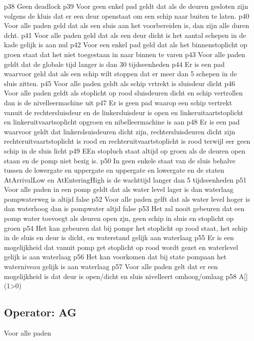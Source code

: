 p38 Geen deadlock
p39 Voor geen enkel pad geldt dat als  de deuren gesloten zijn volgens de kluis dat er een deur openstaat om een schip naar buiten te laten.
p40 Voor alle paden geld dat als een sluis aan het voorbereiden is, dan zijn alle duren dcht.
p41 Voor alle paden geld dat als een deur dicht is het aantal schepen in de kade gelijk is aan nul	
p42 Voor een enkel pad geld dat als het binnenstoplicht op groen staat dat het niet toegestaan in naar binnen te varen
p43 Voor alle paden geldt dat de globale tijd langer is dan 30 tijdseenheden
p44 Er is een pad waarvoor geld dat als een schip wilt stoppen dat er meer dan 5 schepen in de sluis zitten.
p45 Voor alle paden geldt als schip vrtrekt is sluisdeur dicht
p46 Voor alle paden geldt als stoplicht op rood sluisdeuren dicht en schip vertrollen dan is de nivelleermachine uit
p47 Er is geen pad waarop een schip vertrekt vanuit de rechtersluisdeur en de linkersluisdeur is open en linkeruitaartstoplicht en linkeruitvaartsoplicht opgroen  en nibelleermachine is aan
p48 Er is een pad waarvoor geldt dat linkerslsuisdeuren dicht zijn, rechtersluisdeuren dicht zijn rechteruitvaartstoplicht is rood en rechteruitvaartstoplicht is  rood terwijl eer geen schip in de sluis licht
p49 EEn stopluch staat altijd op groen als de deuren open staan en de pomp niet bezig is.
p50 In geen enkele staat van de sluis behalve tussen de lowergate en uppergate en uppergate en lowergate en de staten AtArrivalLow en AtEnteringHigh is de wachttijd langer dan 5 tijdseenheden
p51 Voor alle paden in een pomp geldt dat als water level lager is dan waterlaag pompwaterweg is altijd false
p52 Voor alle paden gelft dat als water level hoger is dan waterhoog dan is pompwater altjd false
p53 Het zal nooit gebeuren dat een pomp water toevoegt als deuren open zjn, geen schip in sluis en stoplicht op groen
p54 Het kan gebeuren dat bij pompr het stoplicht op rood staat, het schip in de sluis en deur is dicht, en waterstand gelijk aan waterlaag
p55 Er is een mogelijkheid  dat vanuit pomp get stoplicht op rood wordt gezet en waterlevel gelijk is aan waterlaag
p56 Het kan voorkomen dat bij state pompaan het waterniveau gelijk is aan waterlaag
p57 Voor alle paden gelt dat er een mogelijkheid is dat deur is open/dicht en sluis nivelleert omhoog/omlaag
p58 A[](1>0)




\subsection{Operator: AG}
Voor alle paden


